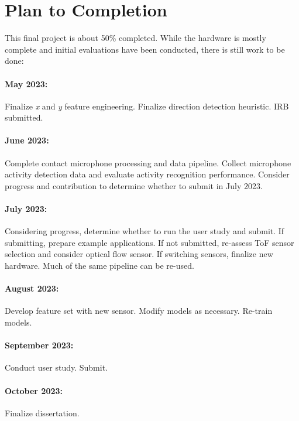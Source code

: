 \documentclass [11pt, proquest] {uwthesis}[2020/02/24]
\begin{document}

\chapter{Plan to Completion}

This final project is about 50\% completed. While the hardware is mostly complete and initial evaluations have been conducted, there is still work to be done:

\subsubsection{May 2023:}
Finalize \textit{x} and \textit{y} feature engineering. Finalize direction detection heuristic. IRB submitted.

\subsubsection{June 2023:}
Complete contact microphone processing and data pipeline. Collect microphone activity detection data and evaluate activity recognition performance. Consider progress and contribution to determine whether to submit in July 2023.

\subsubsection{July 2023:}
Considering progress, determine whether to run the user study and submit. If submitting, prepare example applications. If not submitted, re-assess ToF sensor selection and consider optical flow sensor. If switching sensors, finalize new hardware. Much of the same pipeline can be re-used.

\subsubsection{August 2023:}
Develop feature set with new sensor. Modify models as necessary. Re-train models.

\subsubsection{September 2023:}
Conduct user study. Submit.

\subsubsection{October 2023:}
Finalize dissertation.
\end{document}
